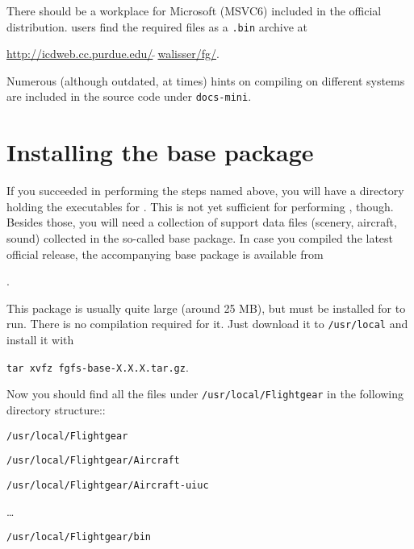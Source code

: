 There should be a workplace for Microsoft  (MSVC6) included in the official
\FlightGear{} distribution.  users find the required 
files as a \texttt{.bin} archive at
 \medskip

\href{http://icdweb.cc.purdue.edu/~walisser/fg/}{http://icdweb.cc.purdue.edu/$\tilde{~~}$walisser/fg/}.

Numerous (although outdated, at times) hints on compiling on different systems are included in the source code under \texttt{docs-mini}.

\section{Installing the base package}

If you succeeded in performing the steps named above, you will have a directory holding the
executables for \FlightGear{}$\!$. This is not yet sufficient for performing
\FlightGear{}$\!$, though. Besides those, you will need a collection of support data
files (scenery, aircraft, sound) collected in the so-called base package. In case you
compiled the latest official release, the accompanying base package is available from
 \medskip

.

This package is usually quite large (around 25 MB), but
must be installed for \FlightGear{} to run. There is no compilation required for it. Just download it to \texttt{/usr/local} and install it with
 \medskip

    \texttt{tar xvfz fgfs-base-X.X.X.tar.gz}.

 \noindent
Now you should find all the \FlightGear{} files under \texttt{/usr/local/Flightgear} in the
following directory structure::
\medskip

 \texttt{/usr/local/Flightgear}

 \texttt{/usr/local/Flightgear/Aircraft}

 \texttt{/usr/local/Flightgear/Aircraft-uiuc}

 \ldots

 \texttt{/usr/local/Flightgear/bin}

